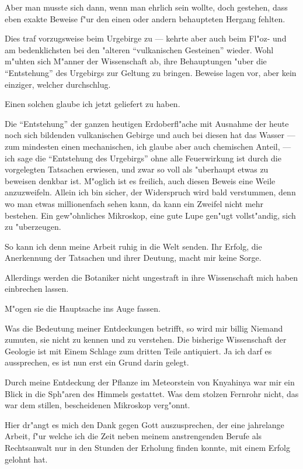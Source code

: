 \documentclass[a4paper, 11pt, oneside, german]{article}
\begin{document}
Aber man musste sich dann, wenn man ehrlich sein wollte, doch gestehen, dass eben exakte Beweise f"ur den einen oder andern behaupteten Hergang fehlten.

Dies traf vorzugsweise beim Urgebirge zu --- kehrte aber auch beim Fl"oz- und am bedenklichsten bei den "alteren "`vulkanischen Gesteinen"' wieder. Wohl m"uhten sich M"anner der Wissenschaft ab, ihre Behauptungen "uber die "`Entstehung"' des Urgebirgs zur Geltung zu bringen. Beweise lagen vor, aber kein einziger, welcher durchschlug.

Einen solchen glaube ich jetzt geliefert zu haben.

Die "`Entstehung"' der ganzen heutigen Erdoberfl"ache mit Ausnahme der heute noch sich bildenden vulkanischen Gebirge und auch bei diesen hat das Wasser --- zum mindesten einen mechanischen, ich glaube aber auch chemischen Anteil, --- ich sage die "`Entstehung des Urgebirgs"' ohne alle Feuerwirkung ist durch die vorgelegten Tatsachen erwiesen, und zwar so voll als "uberhaupt etwas zu beweisen denkbar ist. M"oglich ist es freilich, auch diesen Beweis eine Weile anzuzweifeln. Allein ich bin sicher, der Widerspruch wird bald verstummen, denn wo man etwas millionenfach sehen kann, da kann ein Zweifel nicht mehr bestehen. Ein gew"ohnliches Mikroskop, eine gute Lupe gen"ugt vollst"andig, sich zu "uberzeugen.

So kann ich denn meine Arbeit ruhig in die Welt senden. Ihr Erfolg, die Anerkennung der Tatsachen und ihrer Deutung, macht mir keine Sorge.

Allerdings werden die Botaniker nicht ungestraft in ihre Wissenschaft mich haben einbrechen lassen.

M"ogen sie die Hauptsache ins Auge fassen.

Was die Bedeutung meiner Entdeckungen betrifft, so wird mir billig Niemand zumuten, sie nicht zu kennen und zu verstehen. Die bisherige Wissenschaft der Geologie ist mit Einem Schlage zum dritten Teile antiquiert. Ja ich darf es aussprechen, es ist nun erst ein Grund darin gelegt.

Durch meine Entdeckung der Pflanze im Meteorstein von Knyahinya war mir ein Blick in die Sph"aren des Himmels gestattet. Was dem stolzen Fernrohr nicht, das war dem stillen, bescheidenen Mikroskop verg"onnt.

Hier dr"angt es mich den Dank gegen Gott auszusprechen, der eine jahrelange Arbeit, f"ur welche ich die Zeit neben meinem anstrengenden Berufe als Rechtsanwalt nur in den Stunden der Erholung finden konnte, mit einem Erfolg gelohnt hat.
\end{document}
